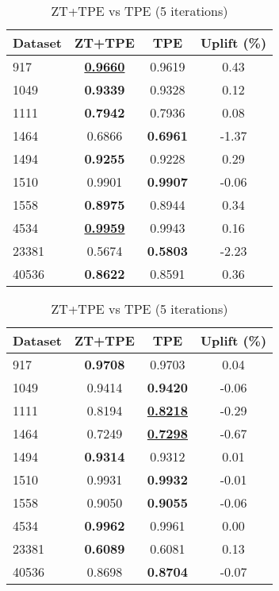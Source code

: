 \begin{table}[htbp]
\begin{center}
\begin{small}
\begin{sc}
\begin{subtable}[t]{0.48\textwidth}
    \centering
    \caption{ZT+TPE vs TPE (1 iteration)}
    \label{tab:xgboost-optuna-1}
    \begin{tabular}{lccc}
    \toprule
    \textbf{Dataset} & \textbf{ZT+TPE} & \textbf{TPE} & \textbf{Uplift (\%)} \\
    \midrule
    917    & \underline{\textbf{0.9660}} & 0.9619 & 0.43 \\
    1049    & \textbf{0.9339} & 0.9328 & 0.12 \\
    1111    & \textbf{0.7942} & 0.7936 & 0.08 \\
    1464    & 0.6866 & \textbf{0.6961} & -1.37 \\
    1494    & \textbf{0.9255} & 0.9228 & 0.29 \\
    1510    & 0.9901 & \textbf{0.9907} & -0.06 \\
    1558    & \textbf{0.8975} & 0.8944 & 0.34 \\
    4534    & \underline{\textbf{0.9959}} & 0.9943 & 0.16 \\
    23381    & 0.5674 & \textbf{0.5803} & -2.23 \\
    40536    & \textbf{0.8622} & 0.8591 & 0.36 \\
    \bottomrule
    \end{tabular}
\end{subtable}
\hfill
\begin{subtable}[t]{0.48\textwidth}
    \centering
    \caption{ZT+TPE vs TPE (5 iterations)}
    \label{tab:xgboost-optuna-5}
    \begin{tabular}{lccc}
    \toprule
    \textbf{Dataset} & \textbf{ZT+TPE} & \textbf{TPE} & \textbf{Uplift (\%)} \\
    \midrule
    917    & \textbf{0.9708} & 0.9703 & 0.04 \\
    1049    & 0.9414 & \textbf{0.9420} & -0.06 \\
    1111    & 0.8194 & \underline{\textbf{0.8218}} & -0.29 \\
    1464    & 0.7249 & \underline{\textbf{0.7298}} & -0.67 \\
    1494    & \textbf{0.9314} & 0.9312 & 0.01 \\
    1510    & 0.9931 & \textbf{0.9932} & -0.01 \\
    1558    & 0.9050 & \textbf{0.9055} & -0.06 \\
    4534    & \textbf{0.9962} & 0.9961 & 0.00 \\
    23381    & \textbf{0.6089} & 0.6081 & 0.13 \\
    40536    & 0.8698 & \textbf{0.8704} & -0.07 \\
    \bottomrule
    \end{tabular}
\end{subtable}


\end{sc}
\end{small}
\end{center}
\end{table}
